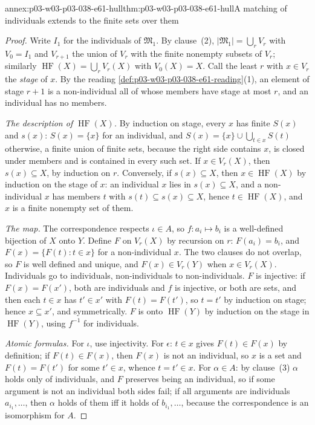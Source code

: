 \begin{annexitem}{annex:p03-w03-p03-038-e61-hull}{thm:p03-w03-p03-038-e61-hull}{A matching of individuals extends to the finite sets over them}
\begin{proof}
Write \(I_1\) for the individuals of \(\mathfrak M_1\). By clause~(2),
\(|\mathfrak M_1|=\bigcup_rV_r\) with \(V_0=I_1\) and \(V_{r+1}\) the union
of \(V_r\) with the finite nonempty subsets of \(V_r\); similarly
\(\operatorname{HF}(X)=\bigcup_rV_r(X)\) with \(V_0(X)=X\). Call the least
\(r\) with \(x\in V_r\) the \emph{stage} of \(x\). By the reading
\cref{def:p03-w03-p03-038-e61-reading}(1), an element of stage \(r+1\) is a
non-individual all of whose members have stage at most \(r\), and an
individual has no members.

\emph{The description of \(\operatorname{HF}(X)\).} By induction on stage,
every \(x\) has finite \(S(x)\) and \(s(x)\): \(S(x)=\{x\}\) for an
individual, and \(S(x)=\{x\}\cup\bigcup_{t\in x}S(t)\) otherwise, a finite
union of finite sets, because the right side contains \(x\), is closed
under members and is contained in every such set. If \(x\in V_r(X)\), then
\(s(x)\subseteq X\), by induction on \(r\). Conversely, if
\(s(x)\subseteq X\), then \(x\in\operatorname{HF}(X)\) by induction on the
stage of \(x\): an individual \(x\) lies in \(s(x)\subseteq X\), and a
non-individual \(x\) has members \(t\) with \(s(t)\subseteq s(x)\subseteq
X\), hence \(t\in\operatorname{HF}(X)\), and \(x\) is a finite nonempty set
of them.

\emph{The map.} The correspondence respects \(\iota\in A\), so
\(f:a_i\mapsto b_i\) is a well-defined bijection of \(X\) onto \(Y\).
Define \(F\) on \(V_r(X)\) by recursion on \(r\): \(F(a_i)=b_i\), and
\(F(x)=\{F(t):t\in x\}\) for a non-individual \(x\). The two clauses do not
overlap, so \(F\) is well defined and unique, and \(F(x)\in V_r(Y)\) when
\(x\in V_r(X)\). Individuals go to individuals, non-individuals to
non-individuals. \(F\) is injective: if \(F(x)=F(x')\), both are individuals
and \(f\) is injective, or both are sets, and then each \(t\in x\) has
\(t'\in x'\) with \(F(t)=F(t')\), so \(t=t'\) by induction on stage; hence
\(x\subseteq x'\), and symmetrically. \(F\) is onto \(\operatorname{HF}(Y)\)
by induction on the stage in \(\operatorname{HF}(Y)\), using \(f^{-1}\) for
individuals.

\emph{Atomic formulas.} For \(\iota\), use injectivity. For \(\epsilon\):
\(t\in x\) gives \(F(t)\in F(x)\) by definition; if \(F(t)\in F(x)\), then
\(F(x)\) is not an individual, so \(x\) is a set and \(F(t)=F(t')\) for
some \(t'\in x\), whence \(t=t'\in x\). For \(\alpha\in A\): by clause~(3)
\(\alpha\) holds only of individuals, and \(F\) preserves being an
individual, so if some argument is not an individual both sides fail; if
all arguments are individuals \(a_{i_1},\ldots\), then \(\alpha\) holds of
them iff it holds of \(b_{i_1},\ldots\), because the correspondence is an
isomorphism for \(A\).
\end{proof}
\end{annexitem}

